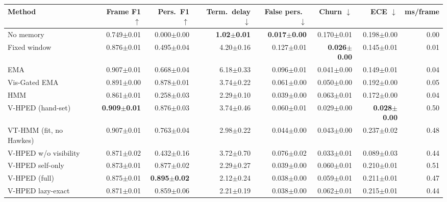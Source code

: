 \begin{tabular}{lrrrrrrr}
\toprule
Method & Frame F1 $\uparrow$ & Pers.\ F1 $\uparrow$ & Term.\ delay $\downarrow$ & False pers.\ $\downarrow$ & Churn $\downarrow$ & ECE $\downarrow$ & ms/frame \\
\midrule
No memory & 0.749$\pm$0.01 & 0.000$\pm$0.00 & \textbf{1.02$\pm$0.01} & \textbf{0.017$\pm$0.00} & 0.170$\pm$0.01 & 0.198$\pm$0.00 & 0.00 \\
Fixed window & 0.876$\pm$0.01 & 0.495$\pm$0.04 & 4.20$\pm$0.16 & 0.127$\pm$0.01 & \textbf{0.026$\pm$0.00} & 0.145$\pm$0.01 & 0.01 \\
EMA & 0.907$\pm$0.01 & 0.668$\pm$0.04 & 6.18$\pm$0.33 & 0.096$\pm$0.01 & 0.041$\pm$0.00 & 0.149$\pm$0.01 & 0.04 \\
Vis-Gated EMA & 0.891$\pm$0.00 & 0.878$\pm$0.01 & 3.74$\pm$0.22 & 0.061$\pm$0.00 & 0.050$\pm$0.00 & 0.192$\pm$0.00 & 0.05 \\
HMM & 0.861$\pm$0.01 & 0.258$\pm$0.03 & 2.29$\pm$0.10 & 0.039$\pm$0.00 & 0.063$\pm$0.01 & 0.172$\pm$0.00 & 0.04 \\
V-HPED (hand-set) & \textbf{0.909$\pm$0.01} & 0.876$\pm$0.03 & 3.74$\pm$0.46 & 0.060$\pm$0.01 & 0.029$\pm$0.00 & \textbf{0.028$\pm$0.00} & 0.50 \\
VT-HMM (fit, no Hawkes) & 0.907$\pm$0.01 & 0.763$\pm$0.04 & 2.98$\pm$0.22 & 0.044$\pm$0.00 & 0.043$\pm$0.00 & 0.237$\pm$0.02 & 0.48 \\
V-HPED w/o visibility & 0.871$\pm$0.02 & 0.432$\pm$0.16 & 3.72$\pm$0.70 & 0.076$\pm$0.02 & 0.033$\pm$0.01 & 0.089$\pm$0.03 & 0.44 \\
V-HPED self-only & 0.873$\pm$0.01 & 0.877$\pm$0.02 & 2.29$\pm$0.27 & 0.039$\pm$0.00 & 0.060$\pm$0.01 & 0.210$\pm$0.01 & 0.51 \\
V-HPED (full) & 0.875$\pm$0.01 & \textbf{0.895$\pm$0.02} & 2.12$\pm$0.24 & 0.038$\pm$0.00 & 0.059$\pm$0.01 & 0.211$\pm$0.01 & 0.47 \\
V-HPED lazy-exact & 0.871$\pm$0.01 & 0.859$\pm$0.06 & 2.21$\pm$0.19 & 0.038$\pm$0.00 & 0.062$\pm$0.01 & 0.215$\pm$0.01 & 0.44 \\
\bottomrule
\end{tabular}
